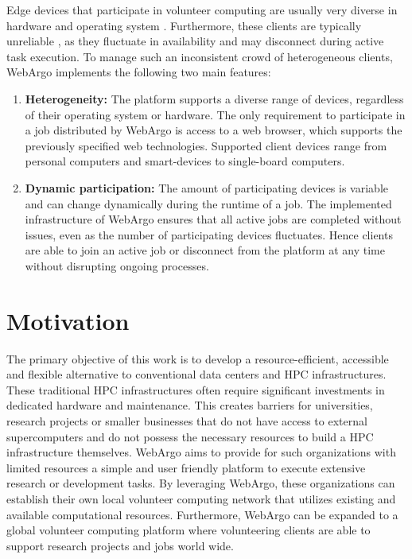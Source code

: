Edge devices that participate in volunteer computing are usually very diverse in hardware and operating system \cite{intro:diverseDevices}. Furthermore, these clients are typically unreliable \cite{relatedwork:boinc1}, as they fluctuate in availability and may disconnect during active task execution. To manage such an inconsistent crowd of heterogeneous clients, WebArgo implements the following two main features:
\begin{enumerate}
    \item \textbf{Heterogeneity:} The platform supports a diverse range of devices, regardless of their operating system or hardware. The only requirement to participate in a job distributed by WebArgo is access to a web browser, which supports the previously specified web technologies. Supported client devices range from personal computers and smart-devices to single-board computers.
    \item \textbf{Dynamic participation:} The amount of participating devices is variable and can change dynamically during the runtime of a job. The implemented infrastructure of WebArgo ensures that all active jobs are completed without issues, even as the number of participating devices fluctuates. Hence clients are able to join an active job or disconnect from the platform at any time without disrupting ongoing processes.
\end{enumerate}

\section{Motivation}
\label{sec:intro:motivation}
The primary objective of this work is to develop a resource-efficient, accessible and flexible alternative to conventional data centers and \ac{HPC} infrastructures. These traditional \ac{HPC} infrastructures often require significant investments in dedicated hardware and maintenance. This creates barriers for universities, research projects or smaller businesses that do not have access to external supercomputers and do not possess the necessary resources to build a \ac{HPC} infrastructure themselves. WebArgo aims to provide for such organizations with limited resources a simple and user friendly platform to execute extensive research or development tasks. By leveraging WebArgo, these organizations can establish their own local volunteer computing network that utilizes existing and available computational resources. Furthermore, WebArgo can be expanded to a global volunteer computing platform where volunteering clients are able to support research projects and jobs world wide.

